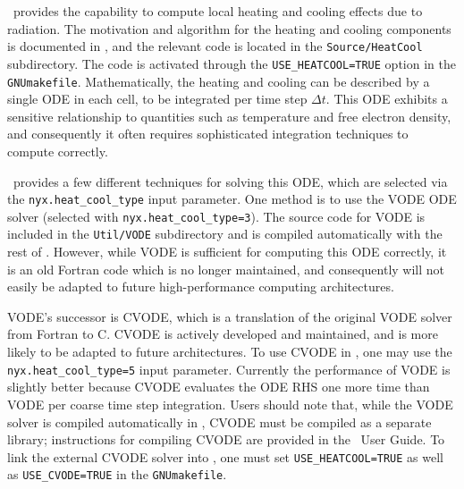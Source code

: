 \label{chap:HeatCool}

\nyx\ provides the capability to compute local heating and cooling effects due to radiation.
The motivation and algorithm for the heating and cooling components is documented in \cite{lukic15}, and the relevant code is located in the \texttt{Source/HeatCool} subdirectory.
The code is activated through the \texttt{USE\_HEATCOOL=TRUE} option in the \texttt{GNUmakefile}.
Mathematically, the heating and cooling can be described by a single ODE in each cell, to be integrated per time step $\Delta t$.
This ODE exhibits a sensitive relationship to quantities such as temperature and free electron density, and consequently it often requires sophisticated integration techniques to compute correctly.

\nyx\ provides a few different techniques for solving this ODE, which are selected via the \texttt{nyx.heat\_cool\_type} input parameter.
One method is to use the VODE ODE solver (selected with \texttt{nyx.heat\_cool\_type=3}).
The source code for VODE is included in the \texttt{Util/VODE} subdirectory and is compiled automatically with the rest of \nyx.
However, while VODE is sufficient for computing this ODE correctly, it is an old Fortran code which is no longer maintained, and consequently will not easily be adapted to future high-performance computing architectures.

VODE's successor is CVODE, which is a translation of the original VODE solver from Fortran to C.
CVODE is actively developed and maintained, and is more likely to be adapted to future architectures.
To use CVODE in \nyx, one may use the \texttt{nyx.heat\_cool\_type=5} input parameter.
Currently the performance of VODE is slightly better because CVODE evaluates the ODE RHS one more time than VODE per coarse time step integration.
Users should note that, while the VODE solver is compiled automatically in \nyx, CVODE must be compiled as a separate library; instructions for compiling CVODE are provided in the \amrex\ User Guide.
To link the external CVODE solver into \nyx, one must set \texttt{USE\_HEATCOOL=TRUE} as well as \texttt{USE\_CVODE=TRUE} in the \texttt{GNUmakefile}.

